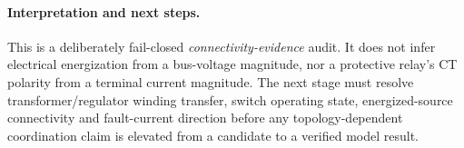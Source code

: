 \paragraph{Interpretation and next steps.}
This is a deliberately fail-closed \emph{connectivity-evidence} audit. It does not infer electrical energization from a bus-voltage magnitude, nor a protective relay's CT polarity from a terminal current magnitude. The next stage must resolve transformer/regulator winding transfer, switch operating state, energized-source connectivity and fault-current direction before any topology-dependent coordination claim is elevated from a candidate to a verified model result.